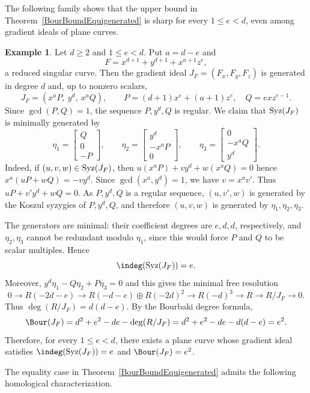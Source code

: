 \documentclass[11pt]{amsart} %
\theoremstyle{definition}
\newtheorem{Example}[Theorem]{Example}
\def\syz{\mbox{\rm Syz}}
\begin{document}
The following family shows that the upper bound in
Theorem~\ref{BourBoundEquigenerated} is sharp for every $1\le e<d$,
even among gradient ideals of plane curves.

\begin{Example}\label{Bour-e-square-gradient}
Let $d\geq 2$ and $1\leq e<d$. Put $a=d-e$ and
\[
F=x^{d+1}+y^{d+1}+x^{a+1}z^e,
\]
a reduced singular curve. Then the gradient ideal $J_F=(F_x,F_y,F_z)$ is generated in degree $d$ and, up to nonzero scalars,
\[
J_F=(x^aP,\ y^d,\ x^aQ),
\qquad
P=(d+1)x^e+(a+1)z^e,\quad Q=exz^{e-1}.
\]
Since $\gcd(P,Q)=1$, the sequence $P,y^d,Q$ is regular. We claim that
$\syz(J_F)$ is minimally generated by
\[
\eta_1=\begin{bmatrix}Q\\0\\-P\end{bmatrix},\qquad
\eta_2=\begin{bmatrix}y^d\\-x^aP\\0\end{bmatrix},\qquad
\eta_3=\begin{bmatrix}0\\-x^aQ\\y^d\end{bmatrix}.
\]
Indeed, if $(u,v,w)\in \syz(J_F)$, then $u(x^aP)+vy^d+w(x^aQ)=0$ hence $x^a(uP+wQ)=-vy^d$. Since $\gcd(x^a,y^d)=1$, we have $v=x^av'$. Thus 
$uP+v'y^d+wQ=0$. As $P,y^d,Q$ is a regular sequence, $(u,v',w)$ is generated by the Koszul
syzygies of $P,y^d,Q$, and therefore $(u,v,w)$ is generated by
$\eta_1,\eta_2,\eta_3$.

The generators are minimal: their coefficient degrees are $e,d,d$, respectively,
and $\eta_2,\eta_3$ cannot be redundant modulo $\eta_1$, since this would force
$P$ and $Q$ to be scalar multiples. Hence
\[
\indeg(\syz(J_F))=e.
\]
Moreover, $y^d\eta_1-Q\eta_2+P\eta_3=0$ and this gives the minimal free resolution
\[
0\to R(-2d-e)
\to R(-d-e)\oplus R(-2d)^2
\to R(-d)^3
\to R
\to R/J_F
\to 0.
\]
Thus $\deg(R/J_F)=d(d-e)$. By the Bourbaki degree formula,
\[
\Bour(J_F)=d^2+e^2-de-\deg(R/J_F)
=d^2+e^2-de-d(d-e)=e^2.
\]
Therefore, for every $1\leq e<d$, there exists a plane curve whose gradient ideal
satisfies $\indeg(\syz(J_F))=e$ and $\Bour(J_F)=e^2$.
\end{Example}

The equality case in Theorem~\ref{BourBoundEquigenerated} admits the
following homological characterization.
\end{document}
